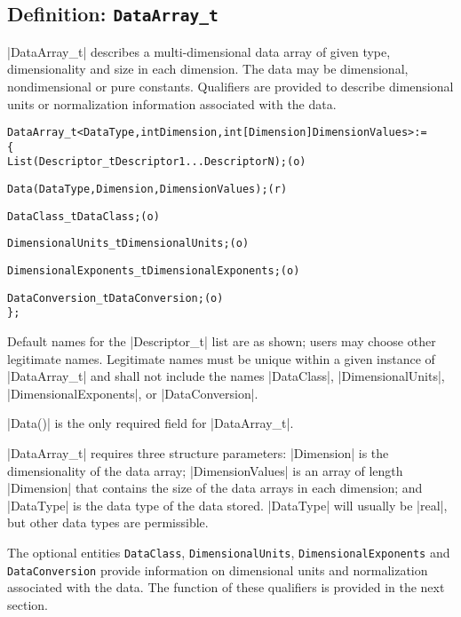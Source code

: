 \subsection{Definition: \texttt{DataArray\_t}}
\label{s:DataArray}

|DataArray_t| describes a multi-dimensional data array of given
type, dimensionality and size in each dimension.  The data may be dimensional,
nondimensional or pure constants.  Qualifiers are provided to describe
dimensional units or normalization information associated with the data.
\begin{alltt}
  DataArray\_t< DataType, int Dimension, int[Dimension] DimensionValues > :=
    \{
    List( Descriptor\_t Descriptor1 ... DescriptorN ) ;                      (o)
 
    Data( DataType, Dimension, DimensionValues ) ;                          (r)

    DataClass\_t DataClass ;                                                 (o)
    
    DimensionalUnits\_t DimensionalUnits ;                                   (o)

    DimensionalExponents\_t DimensionalExponents ;                           (o)
    
    DataConversion\_t DataConversion ;                                       (o)
    \} ;
\end{alltt}

\begin{notes}
\item
 Default names for the |Descriptor_t| list are as shown; 
 users may choose other legitimate names.  Legitimate names must be unique 
 within a given instance of |DataArray_t| and shall not include 
 the names |DataClass|, |DimensionalUnits|, |DimensionalExponents|, or
 |DataConversion|.
\item
 |Data()| is the only required field for |DataArray_t|.
\end{notes}

|DataArray_t| requires three structure parameters: |Dimension| is the 
dimensionality of the data array; |DimensionValues| is an array of length
|Dimension| that contains the size of the data arrays in each dimension;
and |DataType| is the data type of the data stored.  |DataType| will usually
be |real|, but other data types are permissible. 

The optional entities \texttt{DataClass}, \texttt{DimensionalUnits},
\texttt{DimensionalExponents} and \texttt{DataConversion} provide
information on dimensional units and normalization associated with the
data.  The function of these qualifiers is provided in the next section.

